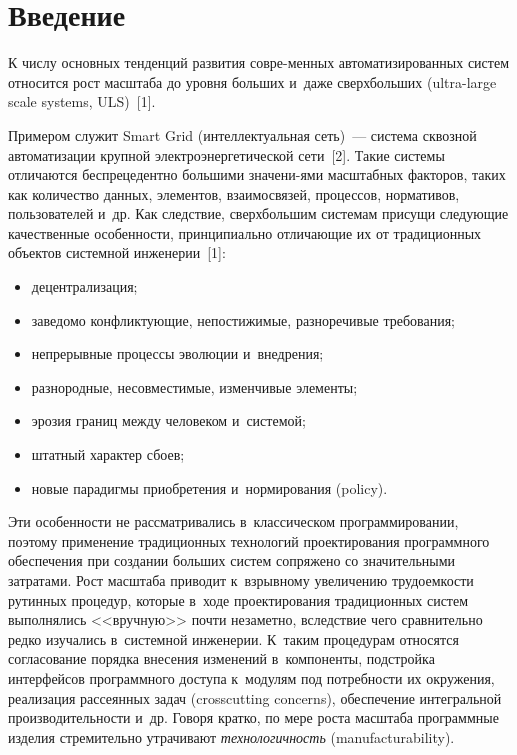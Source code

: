 \thispagestyle{headings}

\begin{multicols}{2}

\label{st\stat}

\section{Введение}

   К числу основных тенденций развития совре-\linebreak менных автоматизированных 
систем относится рост масштаба до уровня больших и~даже сверхбольших 
(ultra-large scale systems, ULS)~[1]. 

Примером служит Smart Grid 
(интеллектуальная сеть)~--- сис\-те\-ма сквозной автоматизации \mbox{крупной} 
электроэнергетической сети~[2]. Такие сис\-те\-мы отличаются %
беспрецедентно 
большими значени-\linebreak ями масштабных факторов, таких как количество данных, 
элементов, взаимосвязей, процессов, норма\-тивов, пользователей и~др. Как 
следствие, сверхбольшим системам присущи следующие качественные 
особенности, принципиально отличающие их от традиционных объектов 
системной инженерии~[1]:
   \begin{itemize}
\item децентрализация;
\item заведомо конфликтующие, непостижимые, разноречивые требования;
\item непрерывные процессы эволюции и~внедрения;
\item разнородные, несовместимые, изменчивые элементы;
\item эрозия границ между человеком и~системой;
\item штатный характер сбоев;
\item новые парадигмы приобретения и~нормирования (policy).
\end{itemize}

   Эти особенности не рассматривались в~классическом программировании, 
поэтому применение традиционных технологий проектирования программного 
обеспечения при создании больших сис\-тем сопряжено со значительными 
затратами. Рост масштаба приводит к~взрывному увеличению трудоемкости 
рутинных процедур, которые в~ходе проектирования традиционных систем 
выполнялись <<вручную>> почти незаметно, вследствие чего сравнительно 
редко изучались в~системной инженерии. К~таким процедурам относятся 
согласование порядка внесения изменений в~компоненты, подстройка 
интерфейсов программного доступа к~модулям под потребности их окружения, 
реализация рассеянных задач (crosscutting concerns), обеспечение интегральной 
производительности и~др. Говоря кратко, по мере роста масштаба программные 
изделия стремительно утрачивают \textit{технологичность} (manufacturability).
   

\end{multicols}
